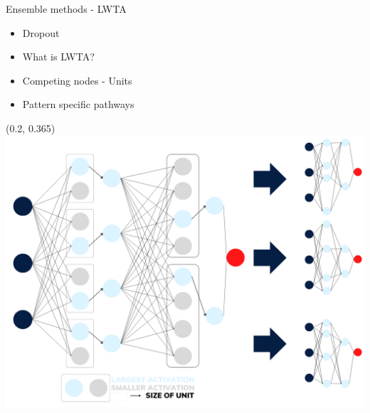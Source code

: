 \documentclass[UKenglish]{beamer}
\begin{document}
\begin{frame}{Ensemble methods - LWTA}
    \begin{itemize}
        \item Dropout
        \item What is LWTA?
        \item Competing nodes - Units
        \item Pattern specific pathways
    \end{itemize}    
    \begin{textblock}{0.58}(0.2, 0.365)
        \includegraphics[width = \textwidth]{figures/Max_out}
    \end{textblock}
\end{frame}
\end{document}

